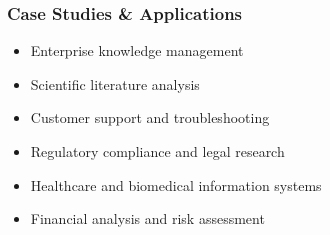 \begin{frame}[fragile]\frametitle{Case Studies \& Applications}
	\begin{itemize}
	\item Enterprise knowledge management
	\item Scientific literature analysis
	\item Customer support and troubleshooting
	\item Regulatory compliance and legal research
	\item Healthcare and biomedical information systems
	\item Financial analysis and risk assessment
	\end{itemize}

\end{frame}







